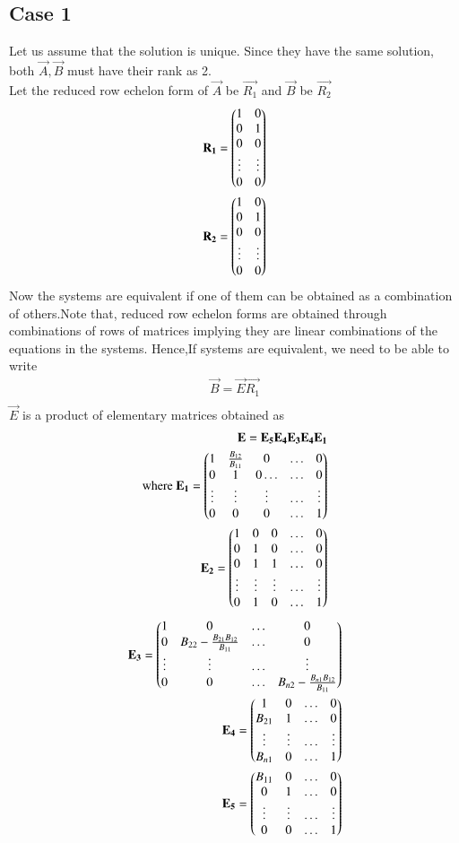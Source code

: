 \documentclass[journal,12pt,twocolumn]{IEEEtran}
\begin{document}
\subsection{Case 1}
Let us assume that the solution is unique.
Since they have the same solution, both $\vec{A},\vec{B}$ must have their rank as 2.\\
Let the reduced row echelon form of $\vec{A}$ be $\vec{R_1}$ and $\vec{B}$ be $\vec{R_2}$
\begin{align}
   \mathbf{R_1}= \begin{pmatrix}1&0\\0&1\\0&0\\ \vdots & \vdots \\0&0\end{pmatrix} \\
    \mathbf{R_2}= \begin{pmatrix}1&0\\0&1\\0&0\\ \vdots & \vdots \\0&0\end{pmatrix}
\end{align}
Now the systems are equivalent if one of them can be obtained as a combination of others.Note that, reduced row echelon forms are obtained through combinations of rows of matrices implying they are linear combinations of the equations in  the systems.
Hence,If systems are equivalent, we need to be able to write 
\begin{align}
    \vec{B}=\vec{E}\vec{R_1}\\
\end{align}
$\vec{E}$ is a product of elementary matrices obtained as
\begin{align}
    \mathbf{E}= \mathbf{E_5}\mathbf{E_4}\mathbf{E_3}\mathbf{E_4}\mathbf{E_1}\\
    \text{where }  \mathbf{E_1}=\begin{pmatrix}1&\frac{B_{12}}{B_{11}}&0&\hdots&0\\0&1&0\hdots&\hdots&0\\\vdots&\vdots&\vdots&\hdots&\vdots\\0&0&0&\hdots&1\end{pmatrix}\\
    \mathbf{E_2}=\begin{pmatrix}1&0&0&\hdots&0\\0&1&0&\hdots&0\\0&1&1&\hdots&0\\\vdots&\vdots&\vdots&\hdots&\vdots\\0&1&0&\hdots&1\end{pmatrix}
\end{align}
\begin{align}
    \mathbf{E_3}=\begin{pmatrix}1&0&\hdots&0\\0& B_{22}-\frac{B_{21}B_{12}}{B_{11}}&\hdots&0\\\vdots&\vdots&\hdots&\vdots\\0&0&\hdots&B_{n2}-\frac{B_{n1}B_{12}}{B_{11}}\end{pmatrix}\\
    \mathbf{E_4}=\begin{pmatrix}1&0&\hdots&0\\B_{21}& 1&\hdots&0\\\vdots&\vdots&\hdots&\vdots\\B_{n1}&0&\hdots&1\end{pmatrix}\\
     \mathbf{E_5}=\begin{pmatrix}B_{11}&0&\hdots&0\\0& 1&\hdots&0\\\vdots&\vdots&\hdots&\vdots\\0&0&\hdots&1\end{pmatrix}
\end{align}
\end{document}
